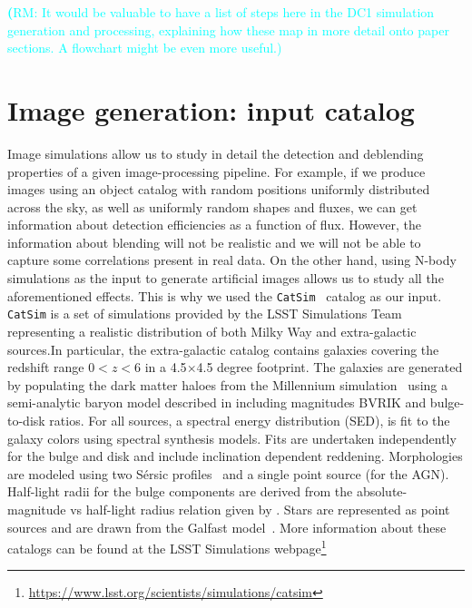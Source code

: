 \documentclass[twocolumn]{aastex62}
\newcommand{\rachel}[1]{{\textcolor{cyan}{{\textbf (RM: #1)}}}}
\begin{document}
\rachel{It would be valuable to have a list of steps here in the DC1 simulation generation and
  processing, explaining how these map in more detail onto paper sections.  A flowchart might be
  even more useful.}


\section{Image generation: input catalog}
\label{sec:inputs}
Image simulations allow us to study in detail the detection and deblending properties of a given image-processing pipeline. For example, if we produce images using an object catalog with random positions uniformly distributed across the sky, as well as uniformly random shapes and fluxes, we can get information about detection efficiencies as a function of flux.  However, the information about blending will not be realistic and we will not be able to capture some correlations present in real data. On the other hand, using N-body simulations as the input to generate artificial images allows us to study all the aforementioned effects. This is why we used the \texttt{CatSim}~\citep{2010SPIE.7738E..1OC,2014SPIE.9150E..14C} catalog as our input.  \texttt{CatSim} is a set of simulations provided by the LSST Simulations Team representing a realistic distribution of both Milky Way and extra-galactic sources.In particular, the extra-galactic catalog contains galaxies covering the redshift range $0 < z < 6$ in a 4.5$\times$4.5 degree footprint. The galaxies are generated by populating the dark matter haloes from the Millennium simulation~\citep{2005Nature.435.629S} using a semi-analytic baryon model described in \citet{2006MNRAS.366..499D} including magnitudes BVRIK and bulge-to-disk ratios. For all sources, a spectral energy distribution (SED), is fit to the galaxy colors using \citet{2003MNRAS.344.1000B} spectral synthesis models. Fits are undertaken independently for the bulge and disk and include inclination dependent reddening. Morphologies are modeled using two S\'{e}rsic profiles~\citep{1963BAAA....6...41S} and a single point source (for the AGN). Half-light radii for the bulge components are derived from the absolute-magnitude vs half-light radius relation given by \citet{2011A&A...534A...3G}. Stars are represented as point sources and are drawn from the Galfast model~\citep{2008ApJ...673..864J}. More information about these catalogs can be found at the LSST Simulations webpage\footnote{\url{https://www.lsst.org/scientists/simulations/catsim}}
\end{document}
